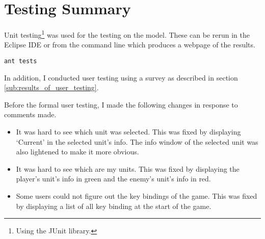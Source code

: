 \section{Testing Summary}

Unit testing\footnote{Using the JUnit library.} was used for the testing on the model. These can be rerun in the Eclipse IDE or from the command line which produces a webpage of the results.

\begin{lstlisting}[caption=Commend to make a webpage of the result of the unit testing]
	ant tests
\end{lstlisting}

In addition, I conducted user testing using a survey as described in section \ref{sub:results_of_user_testing}. 

Before the formal user testing, I made the following changes in response to comments made. 

\begin{itemize}
	\item It was hard to see which unit was selected. This was fixed by  displaying `Current' in the selected unit's info. The info window of the selected unit was also lightened to make it more obvious.
	
	\item It was hard to see which are my units. This was fixed by displaying the player's unit's info in green and the enemy's unit's info in red. 
	
	\item Some users could not figure out the key bindings of the game. This was fixed by displaying a list of all key binding at the start of the game.
\end{itemize}
